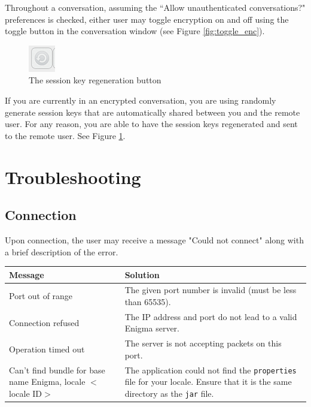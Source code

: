   Throughout a conversation, assuming the ``Allow unauthenticated conversations?" preferences is checked, either user may toggle encryption on and off using the toggle button in the conversation window (see Figure \ref{fig:toggle_enc}).
  
  \begin{figure}
    \centering
    \includegraphics[scale=0.6]{./Figures/AppD/D-5-2b.png}
    \caption{The session key regeneration button}
    \label{fig:regen_keys}
  \end{figure}
  
  If you are currently in an encrypted conversation, you are using randomly generate session keys that are automatically shared between you and the remote user. For any reason, you are able to have the session keys regenerated and sent to the remote user. See Figure \ref{fig:regen_keys}.
  
\section{Troubleshooting}

\subsection{Connection}

Upon connection, the user may receive a message "Could not connect" along with a brief description of the error.

\begin{center}
  \begin{tabular}{| p{5.0cm} | p{5.0cm}|}
    \hline
    \textbf{Message} & \textbf{Solution} \\ \hline \hline
    Port out of range & The given port number is invalid (must be less than 65535). \\ \hline
    Connection refused & The IP address and port do not lead to a valid Enigma server. \\ \hline
    Operation timed out & The server is not accepting packets on this port. \\ \hline
    Can't find bundle for base name Enigma, locale $<$locale ID$>$ & The application could not find the \verb!properties! file for your locale. Ensure that it is the same directory as the \verb!jar! file. \\
    \hline
  \end{tabular}
\end{center}

